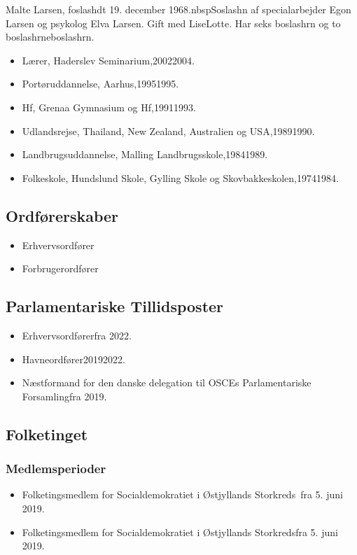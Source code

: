 \documentclass[11pt, a4paper]{awesome-cv}
\begin{document}
\makecvheader[R]
\makelettertitle
\begin{cvletter}
Malte Larsen, foslashdt 19. december 1968.nbspSoslashn af specialarbejder Egon Larsen og psykolog Elva Larsen. Gift med LiseLotte. Har seks boslashrn og to boslashrneboslashrn.

\begin{itemize}
\item Lærer, Haderslev Seminarium,20022004.
\item Portøruddannelse, Aarhus,19951995.
\item Hf, Grenaa Gymnasium og Hf,19911993.
\item Udlandsrejse, Thailand, New Zealand, Australien og USA,19891990.
\item Landbrugsuddannelse, Malling Landbrugsskole,19841989.
\item Folkeskole, Hundslund Skole, Gylling Skole og Skovbakkeskolen,19741984.
\end{itemize}
\subsection*{Ordførerskaber}
\begin{itemize}
\item Erhvervsordfører
\item Forbrugerordfører
\end{itemize}
\subsection*{Parlamentariske Tillidsposter}
\begin{itemize}
\item Erhvervsordførerfra 2022.
\item Havneordfører20192022.
\item Næstformand for den danske delegation til OSCEs Parlamentariske Forsamlingfra 2019.
\end{itemize}
\subsection*{Folketinget}
\subsubsection*{Medlemsperioder}
\begin{itemize}
\item Folketingsmedlem for Socialdemokratiet i Østjyllands Storkreds fra 5. juni 2019.
\item Folketingsmedlem for Socialdemokratiet i Østjyllands Storkredsfra 5. juni 2019.
\end{itemize}

\end{cvletter}
\end{document}
